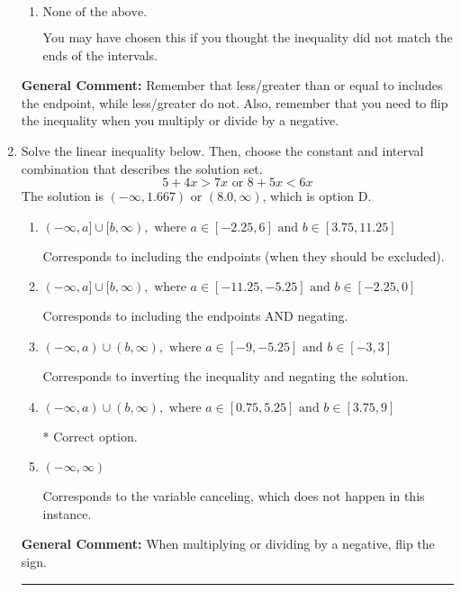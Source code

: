 \documentclass{extbook}[14pt]
\newcommand{\litem}[1]{\item #1

\rule{\textwidth}{0.4pt}}
\begin{document}
\begin{enumerate}
{\begin{enumerate}[label=\Alph*.]
 $(-\infty, 1.077)$, which corresponds to switching the direction of the interval AND negating the endpoint. You likely did this if you did not flip the inequality when dividing by a negative as well as not moving values over to a side properly.
\item \( \text{None of the above}. \)

You may have chosen this if you thought the inequality did not match the ends of the intervals.
\end{enumerate}

\textbf{General Comment:} Remember that less/greater than or equal to includes the endpoint, while less/greater do not. Also, remember that you need to flip the inequality when you multiply or divide by a negative.
}
\litem{
Solve the linear inequality below. Then, choose the constant and interval combination that describes the solution set.
\[ 5 + 4 x > 7 x \text{ or } 8 + 5 x < 6 x \]The solution is \( (-\infty, 1.667) \text{ or } (8.0, \infty) \), which is option D.\begin{enumerate}[label=\Alph*.]
\item \( (-\infty, a] \cup [b, \infty), \text{ where } a \in [-2.25, 6] \text{ and } b \in [3.75, 11.25] \)

Corresponds to including the endpoints (when they should be excluded).
\item \( (-\infty, a] \cup [b, \infty), \text{ where } a \in [-11.25, -5.25] \text{ and } b \in [-2.25, 0] \)

Corresponds to including the endpoints AND negating.
\item \( (-\infty, a) \cup (b, \infty), \text{ where } a \in [-9, -5.25] \text{ and } b \in [-3, 3] \)

Corresponds to inverting the inequality and negating the solution.
\item \( (-\infty, a) \cup (b, \infty), \text{ where } a \in [0.75, 5.25] \text{ and } b \in [3.75, 9] \)

 * Correct option.
\item \( (-\infty, \infty) \)

Corresponds to the variable canceling, which does not happen in this instance.
\end{enumerate}

\textbf{General Comment:} When multiplying or dividing by a negative, flip the sign.
}
\end{enumerate}
\end{document}
